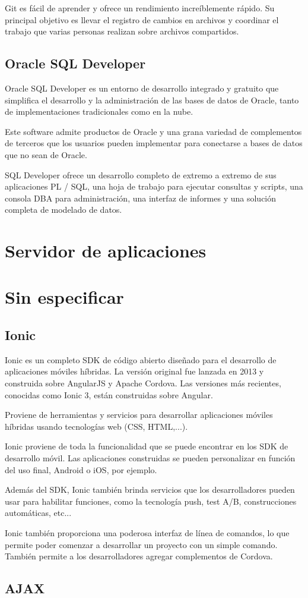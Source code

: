 Git es fácil de aprender y ofrece un rendimiento increíblemente rápido. Su principal objetivo es llevar el registro de cambios en archivos y coordinar el trabajo que varias personas realizan sobre archivos compartidos.


\subsection{Oracle SQL Developer}
Oracle SQL Developer es un entorno de desarrollo integrado y gratuito que simplifica el desarrollo y la administración de las bases de datos de Oracle, tanto de implementaciones tradicionales como en la nube.

Este software admite productos de Oracle y una grana variedad de complementos de terceros que los usuarios pueden implementar para conectarse a bases de datos que no sean de Oracle.

SQL Developer ofrece un desarrollo completo de extremo a extremo de sus aplicaciones PL / SQL, una hoja de trabajo para ejecutar consultas y scripts, una consola DBA para administración, una interfaz de informes y una solución completa de modelado de datos.



\section{Servidor de aplicaciones}

\section{Sin especificar}
\subsection{Ionic}
Ionic es un completo SDK de código abierto diseñado para el desarrollo de aplicaciones móviles híbridas. La versión original fue lanzada en 2013 y construida sobre AngularJS y Apache Cordova. Las versiones más recientes, conocidas como Ionic 3, están construidas sobre Angular.

Proviene de herramientas y servicios para desarrollar aplicaciones móviles híbridas usando tecnologías web (CSS, HTML,...).

Ionic proviene de toda la funcionalidad que se puede encontrar en los SDK de desarrollo móvil. Las aplicaciones construidas se pueden personalizar en función del uso final, Android o iOS, por ejemplo.

Además del SDK, Ionic también brinda servicios que los desarrolladores pueden usar para habilitar funciones, como la tecnología push, test A/B, construcciones automáticas, etc...

Ionic también proporciona una poderosa interfaz de línea de comandos, lo que permite poder comenzar a desarrollar un proyecto con un simple comando. También permite a los desarrolladores agregar complementos de Cordova.

\subsection{AJAX}
